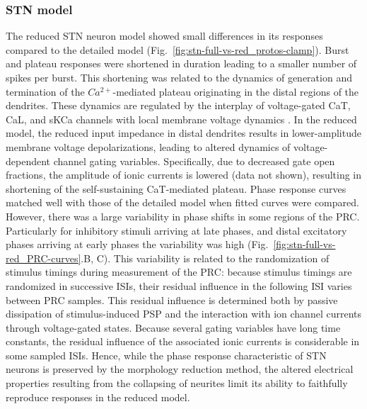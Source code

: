 \subsubsection{STN model}
The reduced STN neuron model showed small differences in its responses compared
to the detailed model (Fig.~\ref{fig:stn-full-vs-red_protos-clamp}). Burst and
plateau responses were shortened in duration leading to a smaller number
of spikes per burst. This shortening was related to the dynamics of generation
and termination of the $Ca^{2+}$-mediated plateau originating in the distal
regions of the dendrites. These dynamics are regulated by the interplay of
voltage-gated CaT, CaL, and sKCa channels with local membrane voltage dynamics
\cite{gillies_membrane_2005}. In the reduced model, the reduced input impedance
in distal dendrites results in lower-amplitude membrane voltage depolarizations,
leading to altered dynamics of voltage-dependent channel gating variables.
Specifically, due to decreased gate open fractions, the amplitude of
ionic currents is lowered (data not shown), resulting in shortening
of the self-sustaining CaT-mediated plateau.
%
%
Phase response curves matched well with those of the detailed model when fitted curves were
compared. However, there was a large variability in phase shifts
in some regions of the PRC. Particularly for inhibitory stimuli arriving
at late phases, and distal excitatory phases arriving at early phases
the variability was high (Fig.~\ref{fig:stn-full-vs-red_PRC-curves}.B, C).
This variability is related to the randomization of stimulus timings
during measurement of the PRC: because stimulus timings are randomized
in successive ISIs, their residual influence in the following ISI
varies between PRC samples. This residual influence is determined both
by passive dissipation of stimulus-induced PSP and the interaction
with ion channel currents through voltage-gated states. Because several
gating variables have long time constants, the residual influence of
the associated ionic currents is considerable in some sampled ISIs.
%
%
%
%
%
%
%
Hence, while the phase response characteristic of STN neurons
is preserved by the morphology reduction method, the altered electrical properties
resulting from the collapsing of neurites limit its ability to faithfully
reproduce responses in the reduced model.


